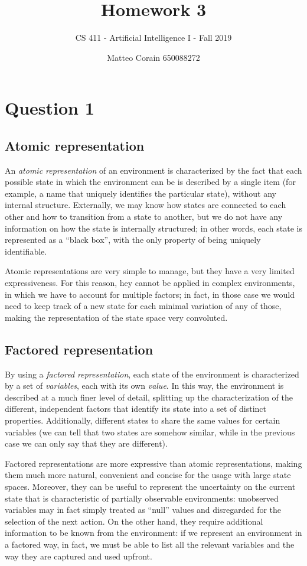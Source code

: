 \documentclass[letterpaper,headings=standardclasses]{scrartcl}
\title{Homework 3}
\subtitle{CS 411 - Artificial Intelligence I - Fall 2019}
\author{Matteo Corain 650088272}
\begin{document}
\maketitle

\section{Question 1}

\subsection{Atomic representation}

An \emph{atomic representation} of an environment is characterized by the fact that each possible state in which the environment can be is described by a single item (for example, a name that uniquely identifies the particular state), without any internal structure. Externally, we may know how states are connected to each other and how to transition from a  state to another, but we do not have any information on how the state is internally structured; in other words, each state is represented as a “black box”, with the only property of being uniquely identifiable.

Atomic representations are very simple to manage, but they have a very limited expressiveness. For this reason, hey cannot be applied in complex environments, in which we have to account for multiple factors; in fact, in those case we would need to keep track of a new state for each minimal variation of any of those, making the representation of the state space very convoluted.

\subsection{Factored representation}

By using a \emph{factored representation}, each state of the environment is characterized by a set of \emph{variables}, each with its own \emph{value}. In this way, the environment is described at a much finer level of detail, splitting up the characterization of the different, independent factors that identify its state into a set of distinct properties. Additionally, different states to share the same values for certain variables (we can tell that two states are somehow similar, while in the previous case we can only say that they are different).

Factored representations are more expressive than atomic representations, making them much more natural, convenient and concise for the usage with large state spaces. Moreover, they can be useful to represent the uncertainty on the current state that is characteristic of partially observable environments: unobserved variables may in fact simply treated as “null” values and disregarded for the selection of the next action. On the other hand, they require additional information to be known from the environment: if we represent an environment in a factored way, in fact, we must be able to list all the relevant variables and the way they are captured and used upfront.
\end{document}
